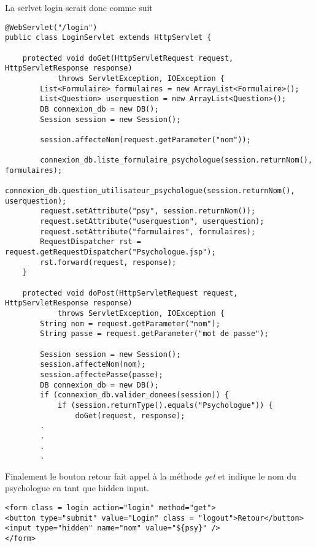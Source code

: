 \documentclass[12]{article}
\begin{document}
La serlvet login serait donc comme suit 



\begin{scriptsize}
\lstset{language=java}
\begin{lstlisting}
@WebServlet("/login")
public class LoginServlet extends HttpServlet {

	protected void doGet(HttpServletRequest request, HttpServletResponse response)
			throws ServletException, IOException {
		List<Formulaire> formulaires = new ArrayList<Formulaire>();
		List<Question> userquestion = new ArrayList<Question>();
		DB connexion_db = new DB();
		Session session = new Session();

		session.affecteNom(request.getParameter("nom"));

		connexion_db.liste_formulaire_psychologue(session.returnNom(), formulaires);
		connexion_db.question_utilisateur_psychologue(session.returnNom(), userquestion);
		request.setAttribute("psy", session.returnNom());
		request.setAttribute("userquestion", userquestion);
		request.setAttribute("formulaires", formulaires);
		RequestDispatcher rst = request.getRequestDispatcher("Psychologue.jsp");
		rst.forward(request, response);
	}

	protected void doPost(HttpServletRequest request, HttpServletResponse response)
			throws ServletException, IOException {
		String nom = request.getParameter("nom");
		String passe = request.getParameter("mot de passe");

		Session session = new Session();
		session.affecteNom(nom);
		session.affectePasse(passe);
		DB connexion_db = new DB();
		if (connexion_db.valider_donees(session)) {
			if (session.returnType().equals("Psychologue")) {
				doGet(request, response);
		.
		.
		.
		.

\end{lstlisting}
\end{scriptsize}




Finalement le bouton retour fait appel à la méthode \textit{get} et indique le nom du psychologue en tant que hidden input.

\begin{scriptsize}
\lstset{language=XML}
\begin{lstlisting}
<form class = login action="login" method="get">
<button type="submit" value="Login" class = "logout">Retour</button>
<input type="hidden" name="nom" value="${psy}" />
</form>
\end{lstlisting}
\end{scriptsize}
\end{document}
